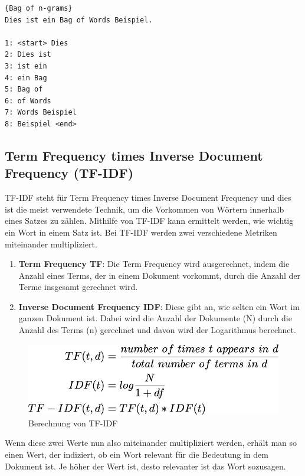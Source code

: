 \begin{lstlisting}[label={lst:bag-of-n-grams},caption={Bag of n-grams}]{Bag of n-grams}
Dies ist ein Bag of Words Beispiel.

1: <start> Dies
2: Dies ist
3: ist ein
4: ein Bag
5: Bag of
6: of Words
7: Words Beispiel
8: Beispiel <end>
\end{lstlisting}

\subsection{Term Frequency times Inverse Document Frequency (TF-IDF)}

TF-IDF steht für Term Frequency times Inverse Document Frequency und dies ist die meist verwendete Technik, um die Vorkommen von Wörtern innerhalb eines Satzes zu zählen.
Mithilfe von TF-IDF kann ermittelt werden, wie wichtig ein Wort in einem Satz ist.
Bei TF-IDF werden zwei verschiedene Metriken miteinander multipliziert.\cite{tfIdf}

\begin{enumerate}
    \item \textbf{Term Frequency TF}: Die Term Frequency wird ausgerechnet, indem die Anzahl eines Terms, der in einem Dokument vorkommt, durch die Anzahl der Terme insgesamt gerechnet wird.
    \item \textbf{Inverse Document Frequency IDF}: Diese gibt an, wie selten ein Wort im ganzen Dokument ist.
    Dabei wird die Anzahl der Dokumente (N) durch die Anzahl des Terms (n) gerechnet und davon wird der Logarithmus berechnet.
\end{enumerate}

\begin{figure}[hbt!]
    \centering
    \includegraphics[scale=0.35]{pics/tf_idf}
    \caption{Berechnung von TF-IDF~\cite{tfIdfImage}}
    \label{fig:tf-idf}
\end{figure}

Wenn diese zwei Werte nun also miteinander multipliziert werden, erhält man so einen Wert, der indiziert, ob ein Wort relevant für die Bedeutung in dem Dokument ist.
Je höher der Wert ist, desto relevanter ist das Wort sozusagen.

